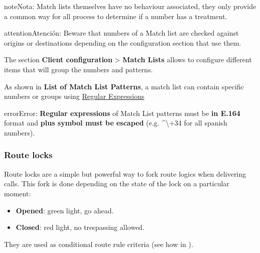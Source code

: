 \documentclass[letterpaper,10pt,spanish]{sphinxmanual}
\begin{document}
\begin{notice}{note}{Nota:}
Match lists themselves have no behaviour associated, they only provide
a common way for all process to determine if a number has a treatment.
\end{notice}

\begin{notice}{attention}{Atención:}
Beware that numbers of a Match list are checked against origins
or destinations depending on the configuration section that use them.
\end{notice}

The section \textbf{Client configuration} \textgreater{} \textbf{Match Lists} allows to configure
different items that will group the numbers and patterns.

As shown in \textbf{List of Match List Patterns}, a match list can contain specific numbers or groups using
\href{http://php.net/manual/en/reference.pcre.pattern.syntax.php}{Regular Expressions}

\begin{notice}{error}{Error:}
\textbf{Regular expressions} of Match List patterns must be \textbf{in E.164} format and \textbf{plus symbol must be
escaped} (e.g. \textasciicircum{}\textbackslash{}+34 for all spanish numbers).
\end{notice}


\subsubsection{Route locks}
\label{administration_portal/client/vpbx/routing_tools/route_locks:id1}\label{administration_portal/client/vpbx/routing_tools/route_locks::doc}\label{administration_portal/client/vpbx/routing_tools/route_locks:route-locks}
Route locks are a simple but powerful way to fork route logics when delivering calls. This fork is done depending on the
state of the lock on a particular moment:
\begin{itemize}
\item {} 
\textbf{Opened}: green light, go ahead.

\item {} 
\textbf{Closed}: red light, no trespassing allowed.

\end{itemize}

They are used as conditional route rule criteria (see how in {\hyperref[administration_portal/client/vpbx/routing_endpoints/conditional_routes:conditional\string-routes]{}}).
\end{document}
